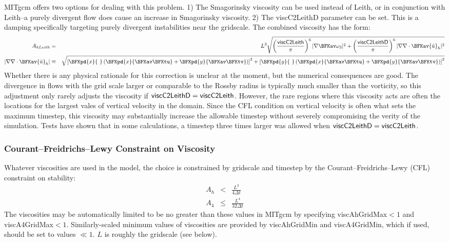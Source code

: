 MITgcm offers two options for dealing with this problem.  1) The
Smagorinsky viscosity can be used instead of Leith, or in conjunction
with Leith--a purely divergent flow does cause an increase in
Smagorinsky viscosity.  2) The {\sf viscC2LeithD} parameter can be
set.  This is a damping specifically targeting purely divergent
instabilities near the gridscale.  The combined viscosity has the
form:
\begin{eqnarray}
A_{hLeith} & = & 
L^3\sqrt{\left(\frac{{\sf viscC2Leith}}{\pi}\right)^6
  |\nabla \BFKav \omega_3|^2
  +\left(\frac{{\sf viscC2LeithD}}{\pi}\right)^6
  |\nabla \nabla\cdot \BFKav {\tilde u}_h|^2} \\
|\nabla \nabla\cdot \BFKav {\tilde u}_h| & \equiv & 
\sqrt{\left[\BFKpd{x}{\ }\left(\BFKpd{x}{\BFKav \BFKtu}
      +\BFKpd{y}{\BFKav \BFKtv}\right)\right]^2
  +\left[\BFKpd{y}{\ }\left(\BFKpd{x}{\BFKav \BFKtu}
      +\BFKpd{y}{\BFKav \BFKtv}\right)\right]^2}
\end{eqnarray}
Whether there is any physical rationale for this correction is unclear
at the moment, but the numerical consequences are good.  The
divergence in flows with the grid scale larger or comparable to the
Rossby radius is typically much smaller than the vorticity, so this
adjustment only rarely adjusts the viscosity if ${\sf
  viscC2LeithD}={\sf viscC2Leith}$.  However, the rare regions where
this viscosity acts are often the locations for the largest vales of
vertical velocity in the domain.  Since the CFL condition on vertical
velocity is often what sets the maximum timestep, this viscosity may
substantially increase the allowable timestep without severely
compromising the verity of the simulation.  Tests have shown that in
some calculations, a timestep three times larger was allowed when
${\sf viscC2LeithD}={\sf viscC2Leith}$.

\subsubsection{Courant--Freidrichs--Lewy Constraint on Viscosity}
Whatever viscosities are used in the model, the choice is constrained
by gridscale and timestep by the Courant--Freidrichs--Lewy (CFL)
constraint on stability:
\begin{eqnarray}
A_h & < & \frac{L^2}{4\Delta t} \\
A_4 & \le & \frac{L^4}{32\Delta t}
\end{eqnarray}
The viscosities may be automatically limited to be no greater than
these values in MITgcm by specifying {\sf viscAhGridMax}$<1$ and
{\sf viscA4GridMax}$<1$.  Similarly-scaled minimum values of
viscosities are provided by {\sf viscAhGridMin} and {\sf
  viscA4GridMin}, which if used, should be set to values $\ll 1$. $L$
is roughly the gridscale (see below).

